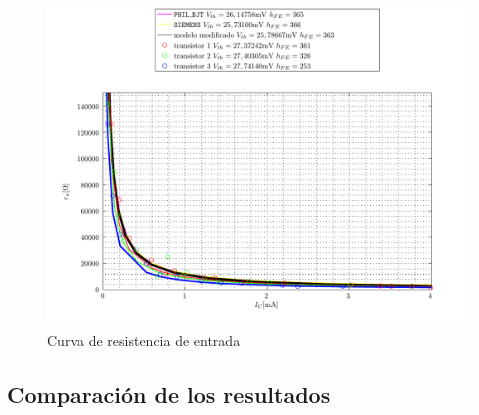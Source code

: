 \documentclass[10pt,spanish,a4paper,openany,notitlepage]{article}
\begin{document}
\begin{figure}[H] %
\begin{center}
\includegraphics[scale=0.7]{./Octave/rpi.pdf}
\caption{Curva de resistencia de entrada}
 \label{fig:rpi}
\end{center}
\end{figure}

\subsection{Comparación de los resultados}
\end{document}
